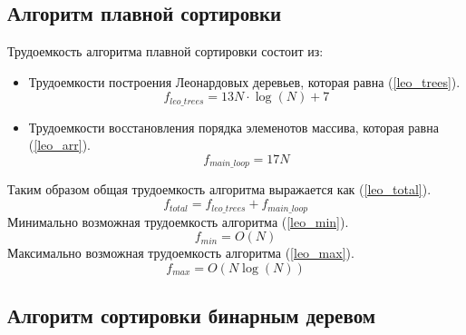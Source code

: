 \subsection{Алгоритм плавной сортировки}

Трудоемкость алгоритма плавной сортировки состоит из:
\begin{itemize}
	\item Трудоемкости построения Леонардовых деревьев, которая равна (\ref{leo_trees}).
	\begin{equation}
		\label{leo_trees}
		f_{leo\_trees} = 13 N \cdot \log(N) + 7
	\end{equation}
	\item Трудоемкости восстановления порядка элеменотов массива, которая равна (\ref{leo_arr}).
	\begin{equation}
		\label{leo_arr}
		f_{main\_loop} = 17 N
	\end{equation}
\end{itemize}
Таким образом общая трудоемкость алгоритма выражается как (\ref{leo_total}).
\begin{equation}
	\label{leo_total}
	f_{total} = f_{leo\_trees} + f_{main\_loop}
\end{equation}
Минимально возможная трудоемкость алгоритма (\ref{leo_min}).
\begin{equation}
	\label{leo_min}
	f_{min} = O(N)
\end{equation}
Максимально возможная трудоемкость алгоритма (\ref{leo_max}).
\begin{equation}
	\label{leo_max}
	f_{max} = O(N\log(N))
\end{equation}



\subsection{Алгоритм сортировки бинарным деревом}

